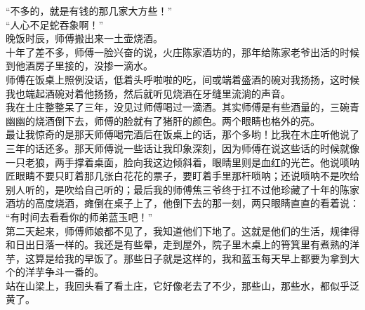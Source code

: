 “不多的，就是有钱的那几家大方些！”\\

“人心不足蛇吞象啊！”\\

晚饭时辰，师傅搬出来一土壶烧酒。\\

十年了差不多，师傅一脸兴奋的说，火庄陈家酒坊的，那年给陈家老爷出活的时候到他酒房子里接的，没掺一滴水。\\

师傅在饭桌上照例没话，低着头呼啦啦的吃，间或端着盛酒的碗对我扬扬，这时候我也端起酒碗对着他扬扬，然后就听见烧酒在牙缝里流淌的声音。\\

我在土庄整整呆了三年，没见过师傅喝过一滴酒。其实师傅是有些酒量的，三碗青幽幽的烧酒倒下去，师傅的脸就有了猪肝的颜色。两个眼睛也格外的亮。\\

最让我惊奇的是那天师傅喝完酒后在饭桌上的话，那个多哟！比我在木庄听他说了三年的话还多。那天师傅说一些话让我印象深刻，因为师傅在说这些话的时候就像一只老狼，两手撑着桌面，脸向我这边倾斜着，眼睛里则是血红的光芒。他说唢呐匠眼睛不要只盯着那几张白花花的票子，要盯着手里那杆唢呐；还说唢呐不是吹给别人听的，是吹给自己听的；最后我的师傅焦三爷终于扛不过他珍藏了十年的陈家酒坊的高度烧酒，瘫倒在桌子上了，他倒下去的那一刻，两只眼睛直直的看着说：\\

“有时间去看看你的师弟蓝玉吧！”\\

第二天起来，师傅师娘都不见了，我知道他们下地了。这就是他们的生活，规律得和日出日落一样的。我还是有些晕，走到屋外，院子里木桌上的筲箕里有煮熟的洋芋，这算是给我的早饭了。那些日子就是这样的，我和蓝玉每天早上都要为拿到大个的洋芋争斗一番的。\\

站在山梁上，我回头看了看土庄，它好像老去了不少，那些山，那些水，都似乎泛黄了。\\